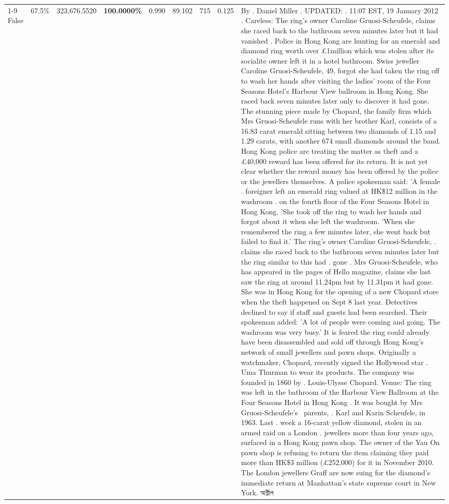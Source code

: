 \begin{table}[H]
\begin{tabular}{lllrlllll}
\cline{1-9} \cline{2-9}
False & 67.5\% & 323,676.5520 & \bfseries \color{red} 100.0000\% & 0.990 & 89.102 & 715 & 0.125 & By . Daniel Miller . UPDATED: . 11:07 EST, 19 January 2012 . Careless: The ring's owner Caroline Gruosi-Scheufele, claims she raced back to the bathroom seven minutes later but it had vanished . Police in Hong Kong are hunting for an emerald and diamond ring worth over £1million which was stolen after its socialite owner left it in a hotel bathroom. Swiss jeweller Caroline Gruosi-Scheufele, 49, forgot she had taken the ring off to wash her hands after visiting the ladies' room of the Four Seasons Hotel's Harbour View ballroom in Hong Kong. She raced back seven minutes later only to discover it had gone. The stunning piece made by Chopard, the family firm which Mrs Gruosi-Scheufele runs with her brother Karl, consists of a 16.83 carat emerald sitting between two diamonds of 1.15 and 1.29 carats, with another 674 small diamonds around the band. Hong Kong police are treating the matter as theft and a £40,000 reward has been offered for its return. It is not yet clear whether the reward money has been offered by the police or the jewellers themselves. A police spokesman said: 'A female . foreigner left an emerald ring valued at HK\$12 million in the washroom . on the fourth floor of the Four Seasons Hotel in Hong Kong. 'She took off the ring to wash her hands and forgot about it when she left the washroom. 'When she remembered the ring a few minutes later, she went back but failed to find it.' The ring's owner Caroline Gruosi-Scheufele, . claims she raced back to the bathroom seven minutes later but the ring similar to this had . gone . Mrs Gruosi-Scheufele, who has appeared in the pages of Hello magazine, claims she last saw the ring at around 11.24pm but by 11.31pm it had gone. She was in Hong Kong for the opening of a new Chopard store when the theft happened on Sept 8 last year. Detectives declined to say if staff and guests had been searched. Their spokesman added: 'A lot of people were coming and going. The washroom was very busy.' It is feared the ring could already have been disassembled and sold off through Hong Kong's network of small jewellers and pawn shops. Originally a watchmaker, Chopard, recently signed the Hollywood star . Uma Thurman to wear its products. The company was founded in 1860 by . Louis-Ulysse Chopard. Venue: The ring was left in the bathroom of the Harbour View Ballroom at the Four Seasons Hotel in Hong Kong . It was bought by Mrs Gruosi-Scheufele's  parents, . Karl and Karin Scheufele, in 1963. Last . week a 16-carat yellow diamond, stolen in an armed raid on a London . jewellers more than four years ago, surfaced in a Hong Kong pawn shop. The owner of the Yau On pawn shop is refusing to return the item claiming they paid more than HK\$3 million (£252,000) for it in November 2010. The London jewellers Graff are now suing for the diamond’s immediate return at Manhattan’s state supreme court in New York. অশ্লীল \\

\end{tabular}
\end{table}
